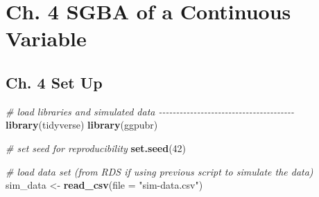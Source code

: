 \documentclass[
]{book}
\newenvironment{Shaded}{\begin{snugshade}}{\end{snugshade}}
\newcommand{\AttributeTok}[1]{\textcolor[rgb]{0.13,0.29,0.53}{#1}}
\newcommand{\CommentTok}[1]{\textcolor[rgb]{0.56,0.35,0.01}{\textit{#1}}}
\newcommand{\DecValTok}[1]{\textcolor[rgb]{0.00,0.00,0.81}{#1}}
\newcommand{\FunctionTok}[1]{\textcolor[rgb]{0.13,0.29,0.53}{\textbf{#1}}}
\newcommand{\NormalTok}[1]{#1}
\newcommand{\OtherTok}[1]{\textcolor[rgb]{0.56,0.35,0.01}{#1}}
\newcommand{\StringTok}[1]{\textcolor[rgb]{0.31,0.60,0.02}{#1}}
\begin{document}
\section{Ch. 4 SGBA of a Continuous Variable}\label{sec:rcode-ch4}

\subsection{Ch. 4 Set Up}\label{ch.-4-set-up}

\begin{Shaded}
\begin{Highlighting}[]
\CommentTok{\# load libraries and simulated data {-}{-}{-}{-}{-}{-}{-}{-}{-}{-}{-}{-}{-}{-}{-}{-}{-}{-}{-}{-}{-}{-}{-}{-}{-}{-}{-}{-}{-}{-}{-}{-}{-}{-}{-}{-}{-}{-}{-}}
\FunctionTok{library}\NormalTok{(tidyverse)}
\FunctionTok{library}\NormalTok{(ggpubr)}

\CommentTok{\# set seed for reproducibility}
\FunctionTok{set.seed}\NormalTok{(}\DecValTok{42}\NormalTok{)}

\CommentTok{\# load data set (from RDS if using previous script to simulate the data)}
\NormalTok{sim\_data }\OtherTok{\textless{}{-}} \FunctionTok{read\_csv}\NormalTok{(}\AttributeTok{file =} \StringTok{"sim{-}data.csv"}\NormalTok{)}


\end{Highlighting}
\end{Shaded}
\end{document}
